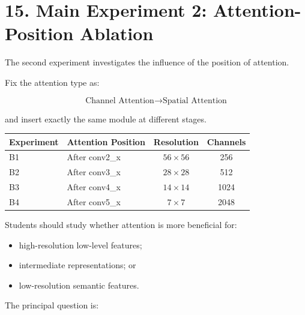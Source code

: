 \documentclass[10pt]{article}
\begin{document}
\section*{15. Main Experiment 2: Attention-Position Ablation}

The second experiment investigates the influence of the position of
attention.

Fix the attention type as:

\[
\boxed{
\text{Channel Attention}
\rightarrow
\text{Spatial Attention}
}
\]

and insert exactly the same module at different stages.

\begin{center}

\begin{tabular}{|l|l|c|c|}
\hline

\textbf{Experiment}
&
\textbf{Attention Position}
&
\textbf{Resolution}
&
\textbf{Channels}
\\
\hline

B1
&
After conv2\_x
&
$56\times56$
&
256
\\
\hline

B2
&
After conv3\_x
&
$28\times28$
&
512
\\
\hline

B3
&
After conv4\_x
&
$14\times14$
&
1024
\\
\hline

B4
&
After conv5\_x
&
$7\times7$
&
2048
\\
\hline

\end{tabular}

\end{center}

Students should study whether attention is more beneficial for:

\begin{itemize}

\item high-resolution low-level features;

\item intermediate representations; or

\item low-resolution semantic features.

\end{itemize}

The principal question is:
\end{document}
